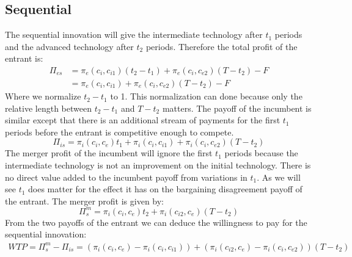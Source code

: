 \documentclass[12pt]{report}
\numberwithin{equation}{section}
\begin{document}
\subsection{Sequential}
The sequential innovation will give the intermediate technology after $t_1$ periods and the advanced technology after $t_2$ periods. Therefore the total profit of the entrant is: 
\begin{align*}
\Pi_{es} &= \pi_e(c_i,c_{i1}) (t_2-t_1) +\pi_e(c_i,c_{e2})(T-t_2)-F \\
&= \pi_e(c_i,c_{i1}) +\pi_e(c_i,c_{e2})(T-t_2)-F
\end{align*}
Where we normalize $t_2-t_1$ to 1. This normalization can done because only the relative length between $t_2-t_1$ and $T-t_2$ matters. The payoff of the incumbent is similar except that there is an additional stream of payments for the first $t_1$ periods before the entrant is competitive enough to compete. 
\begin{equation*}
\Pi_{is} = \pi_i(c_i,c_{e})t_1+\pi_i(c_i,c_{i1}) +\pi_i(c_i,c_{e2})(T-t_2)
\end{equation*}
The merger profit of the incumbent will ignore the first $t_1$ periods because the intermediate technology is not an improvement on the initial technology. There is no direct value added to the incumbent payoff from variations in $t_1$. As we will see $t_1$ does matter for the effect it has on the bargaining disagreement payoff of the entrant. The merger profit is given by: 
\begin{equation*}
\Pi_{s}^m= \pi_i(c_i,c_{e}) t_2+\pi_i(c_{i2},c_e)(T-t_2)
\end{equation*}
From the two payoffs of the entrant we can deduce the willingness to pay for the sequential innovation: 
\begin{align*}
WTP=\Pi_{s}^m-\Pi_{is} = (\pi_i(c_i,c_{e})-\pi_i(c_i,c_{i1}))+(\pi_i(c_{i2},c_e)-\pi_i(c_{i},c_{e2}))(T-t_2) \\
\end{align*}
\end{document}
